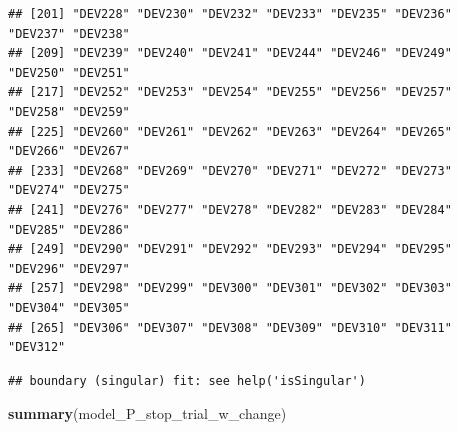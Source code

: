 \documentclass[
]{article}
\newenvironment{Shaded}{\begin{snugshade}}{\end{snugshade}}
\newcommand{\DecValTok}[1]{\textcolor[rgb]{0.00,0.00,0.81}{#1}}
\newcommand{\KeywordTok}[1]{\textcolor[rgb]{0.13,0.29,0.53}{\textbf{#1}}}
\newcommand{\NormalTok}[1]{#1}
\newcommand{\OperatorTok}[1]{\textcolor[rgb]{0.81,0.36,0.00}{\textbf{#1}}}
\newcommand{\StringTok}[1]{\textcolor[rgb]{0.31,0.60,0.02}{#1}}
\begin{document}
\begin{verbatim}
## [201] "DEV228" "DEV230" "DEV232" "DEV233" "DEV235" "DEV236" "DEV237" "DEV238"
## [209] "DEV239" "DEV240" "DEV241" "DEV244" "DEV246" "DEV249" "DEV250" "DEV251"
## [217] "DEV252" "DEV253" "DEV254" "DEV255" "DEV256" "DEV257" "DEV258" "DEV259"
## [225] "DEV260" "DEV261" "DEV262" "DEV263" "DEV264" "DEV265" "DEV266" "DEV267"
## [233] "DEV268" "DEV269" "DEV270" "DEV271" "DEV272" "DEV273" "DEV274" "DEV275"
## [241] "DEV276" "DEV277" "DEV278" "DEV282" "DEV283" "DEV284" "DEV285" "DEV286"
## [249] "DEV290" "DEV291" "DEV292" "DEV293" "DEV294" "DEV295" "DEV296" "DEV297"
## [257] "DEV298" "DEV299" "DEV300" "DEV301" "DEV302" "DEV303" "DEV304" "DEV305"
## [265] "DEV306" "DEV307" "DEV308" "DEV309" "DEV310" "DEV311" "DEV312"
\end{verbatim}

\begin{Shaded}
\end{Shaded}

\begin{verbatim}
## boundary (singular) fit: see help('isSingular')
\end{verbatim}

\begin{Shaded}
\begin{Highlighting}[]
\KeywordTok{summary}\NormalTok{(model_P_stop_trial_w_change)}
\end{Highlighting}
\end{Shaded}
\end{document}
